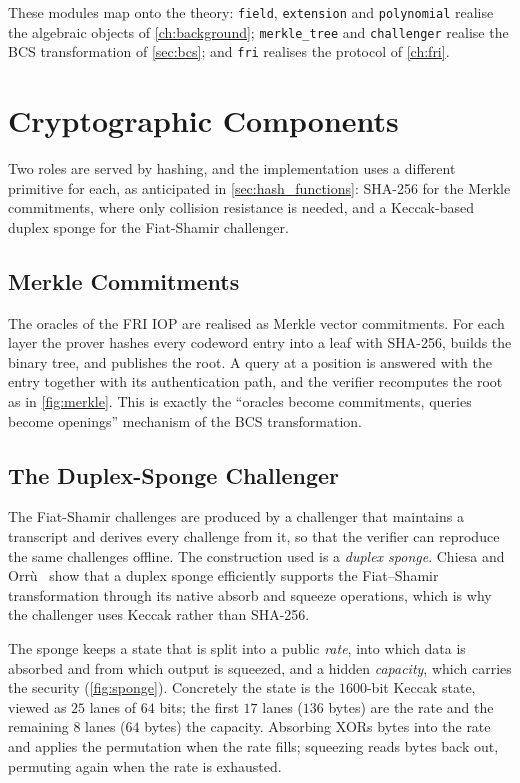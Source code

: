 These modules map onto the theory: \texttt{field}, \texttt{extension}
and \texttt{polynomial} realise the algebraic objects of
\cref{ch:background}; \texttt{merkle\_tree} and \texttt{challenger}
realise the BCS transformation of \cref{sec:bcs}; and \texttt{fri}
realises the protocol of \cref{ch:fri}.


\section{Cryptographic Components}
\label{sec:impl_crypto}

Two roles are served by hashing, and the implementation uses a different
primitive for each, as anticipated in \cref{sec:hash_functions}: SHA-256
for the Merkle commitments, where only collision resistance is needed,
and a Keccak-based duplex sponge for the Fiat-Shamir challenger.

\subsection{Merkle Commitments}
\label{subsec:impl_merkle}

The oracles of the FRI IOP are realised as Merkle vector commitments.
For each layer the prover hashes every codeword entry into a leaf with
SHA-256, builds the binary tree, and publishes the root. A query at a
position is answered with the entry together with its authentication
path, and the verifier recomputes the root as in \cref{fig:merkle}. This
is exactly the ``oracles become commitments, queries become openings''
mechanism of the BCS transformation.

\subsection{The Duplex-Sponge Challenger}
\label{subsec:impl_challenger}

The Fiat-Shamir challenges are produced by a challenger that maintains a
transcript and derives every challenge from it, so that the verifier can
reproduce the same challenges offline. The construction used is a
\emph{duplex sponge}. Chiesa and Orr\`{u}~\cite{CO25} show that a duplex
sponge efficiently supports the Fiat–Shamir transformation through its 
native absorb and squeeze operations, which is why the challenger uses 
Keccak rather than SHA-256.

The sponge keeps a state that is split into a public \emph{rate}, into
which data is absorbed and from which output is squeezed, and a hidden
\emph{capacity}, which carries the security (\cref{fig:sponge}). Concretely the state is the
$1600$-bit Keccak state, viewed as $25$ lanes of $64$ bits; the first
$17$ lanes ($136$ bytes) are the rate and the remaining $8$ lanes
($64$ bytes) the capacity. Absorbing XORs bytes into the rate and applies
the permutation when the rate fills; squeezing reads bytes back out,
permuting again when the rate is exhausted.

